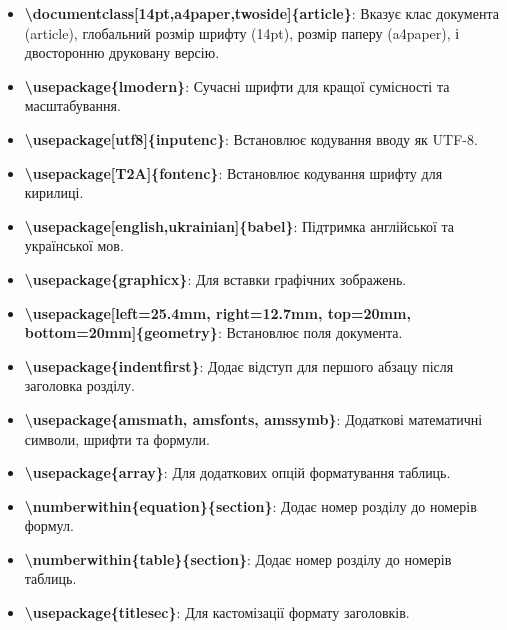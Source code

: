\documentclass[14pt,a4paper,twoside]{article}
\begin{document}
	\begin{itemize}
		\item \textbf{\textbackslash documentclass[14pt,a4paper,twoside]\{article\}}: Вказує клас документа (article), глобальний розмір шрифту (14pt), розмір паперу (a4paper), і двосторонню друковану версію.
		
		\item \textbf{\textbackslash usepackage\{lmodern\}}: Сучасні шрифти для кращої сумісності та масштабування.
		
		\item \textbf{\textbackslash usepackage[utf8]\{inputenc\}}: Встановлює кодування вводу як UTF-8.
		
		\item \textbf{\textbackslash usepackage[T2A]\{fontenc\}}: Встановлює кодування шрифту для кирилиці.
		
		\item \textbf{\textbackslash usepackage[english,ukrainian]\{babel\}}: Підтримка англійської та української мов.
		
		\item \textbf{\textbackslash usepackage\{graphicx\}}: Для вставки графічних зображень.
		
		\item \textbf{\textbackslash usepackage[left=25.4mm, right=12.7mm, top=20mm, bottom=20mm]\{geometry\}}: Встановлює поля документа.
		
		\item \textbf{\textbackslash usepackage\{indentfirst\}}: Додає відступ для першого абзацу після заголовка розділу.
		
		\item \textbf{\textbackslash usepackage\{amsmath, amsfonts, amssymb\}}: Додаткові математичні символи, шрифти та формули.
		
		\item \textbf{\textbackslash usepackage\{array\}}: Для додаткових опцій форматування таблиць.
		
		\item \textbf{\textbackslash numberwithin\{equation\}\{section\}}: Додає номер розділу до номерів формул.
		
		\item \textbf{\textbackslash numberwithin\{table\}\{section\}}: Додає номер розділу до номерів таблиць.
		
		\item \textbf{\textbackslash usepackage\{titlesec\}}: Для кастомізації формату заголовків.
		

\end{itemize}
\end{document}
